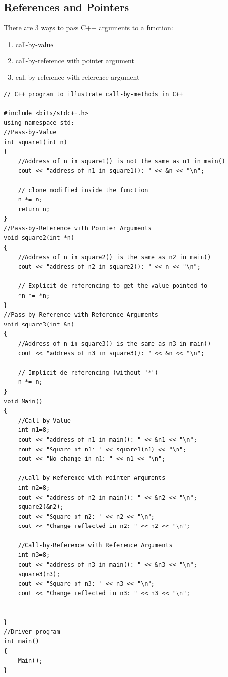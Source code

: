 \documentclass{book}
\begin{document}
\subsection{References and Pointers}

There are 3 ways to pass C++ arguments to a function:

\begin{enumerate}
	\item call-by-value
\item call-by-reference with pointer argument
\item call-by-reference with reference argument
\end{enumerate}

\begin{lstlisting}
// C++ program to illustrate call-by-methods in C++

#include <bits/stdc++.h>
using namespace std;
//Pass-by-Value
int square1(int n)
{
	//Address of n in square1() is not the same as n1 in main()
	cout << "address of n1 in square1(): " << &n << "\n";
	
	// clone modified inside the function
	n *= n;
	return n;
}
//Pass-by-Reference with Pointer Arguments
void square2(int *n)
{
	//Address of n in square2() is the same as n2 in main()
	cout << "address of n2 in square2(): " << n << "\n";
	
	// Explicit de-referencing to get the value pointed-to
	*n *= *n;
}
//Pass-by-Reference with Reference Arguments
void square3(int &n)
{
	//Address of n in square3() is the same as n3 in main()
	cout << "address of n3 in square3(): " << &n << "\n";
	
	// Implicit de-referencing (without '*')
	n *= n;
}
void Main()
{
	//Call-by-Value
	int n1=8;
	cout << "address of n1 in main(): " << &n1 << "\n";
	cout << "Square of n1: " << square1(n1) << "\n";
	cout << "No change in n1: " << n1 << "\n";
	
	//Call-by-Reference with Pointer Arguments
	int n2=8;
	cout << "address of n2 in main(): " << &n2 << "\n";
	square2(&n2);
	cout << "Square of n2: " << n2 << "\n";
	cout << "Change reflected in n2: " << n2 << "\n";
	
	//Call-by-Reference with Reference Arguments
	int n3=8;
	cout << "address of n3 in main(): " << &n3 << "\n";
	square3(n3);
	cout << "Square of n3: " << n3 << "\n";
	cout << "Change reflected in n3: " << n3 << "\n";
	
	
}
//Driver program
int main()
{
	Main();
}
\end{lstlisting}
\end{document}

